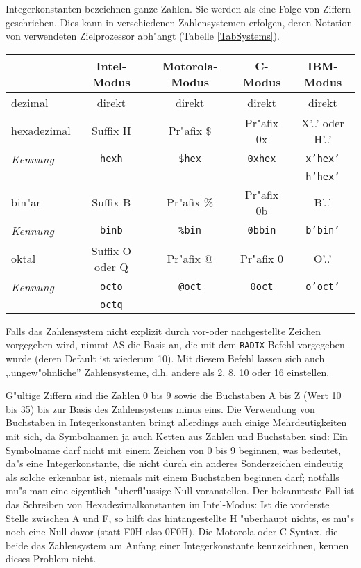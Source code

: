 \documentclass[12pt,a4paper,twoside]{report}
\newcommand{\ii}[1]{{\it #1}}
\newcommand{\tty}[1]{{\tt #1}}
\begin{document}
Integerkonstanten bezeichnen ganze Zahlen.  Sie werden als eine
Folge von Ziffern geschrieben.  Dies kann in verschiedenen
Zahlensystemen erfolgen, deren Notation von verwendeten
Zielprozessor abh"angt (Tabelle
\ref{TabSystems}).
\par
\begin{table*}[htbp]
\begin{center}\begin{tabular}{|l|c|c|c|c|}
\hline
            & Intel-Modus     & Motorola-Modus & C-Modus  & IBM-Modus  \\
\hline
\hline
dezimal     & direkt          & direkt      & direkt      & direkt \\
hexadezimal & Suffix H        & Pr"afix \$  & Pr"afix 0x  & X'..' oder H'..' \\
\ii{Kennung}& \tty{hexh}      & \tty{\$hex} & \tty{0xhex} & \tty{x'hex'} \\
            &                 &             &             & \tty{h'hex'} \\
bin"ar      & Suffix B        & Pr"afix \%  & Pr"afix 0b  & B'..' \\
\ii{Kennung}& \tty{binb}      & \tty{\%bin} & \tty{0bbin} & \tty{b'bin'} \\
oktal       & Suffix O oder Q & Pr"afix @   & Pr"afix 0   & O'..' \\
\ii{Kennung}& \tty{octo}      & \tty{@oct}  & \tty{0oct}  & \tty{o'oct'} \\  
            & \tty{octq}      &             &             & \\
\hline
\end{tabular}\end{center}
\caption{definierte Zahlensysteme und Schreibweisen\label{TabSystems}}
\end{table*}
Falls das Zahlensystem nicht explizit durch vor-oder nachgestellte Zeichen
vorgegeben wird, nimmt AS die Basis an, die mit dem {\tt RADIX}-Befehl
vorgegeben wurde (deren Default ist wiederum 10).  Mit diesem Befehl lassen
sich auch ,,ungew"ohnliche'' Zahlensysteme, d.h. andere als 2, 8, 10 oder 16
einstellen.

G"ultige Ziffern sind die Zahlen 0 bis 9 sowie die Buchstaben A bis Z
(Wert 10 bis 35) bis zur Basis des Zahlensystems minus eins.  Die
Verwendung von Buchstaben in Integerkonstanten bringt allerdings auch
einige Mehrdeutigkeiten mit sich, da Symbolnamen ja auch Ketten aus Zahlen
und Buchstaben sind: Ein Symbolname darf nicht mit einem Zeichen von 0 bis
9 beginnen, was bedeutet, da"s eine Integerkonstante, die nicht durch ein
anderes Sonderzeichen eindeutig als solche erkennbar ist, niemals mit
einem Buchstaben beginnen darf; notfalls mu"s man eine eigentlich
"uberfl"ussige Null voranstellen.  Der bekannteste Fall ist das Schreiben
von Hexadezimalkonstanten im Intel-Modus: Ist die vorderste Stelle
zwischen A und F, so hilft das hintangestellte H "uberhaupt nichts, es
mu"s noch eine Null davor (statt F0H also 0F0H).  Die Motorola-oder
C-Syntax, die beide das Zahlensystem am Anfang einer Integerkonstante
kennzeichnen, kennen dieses Problem nicht.
\end{document}
